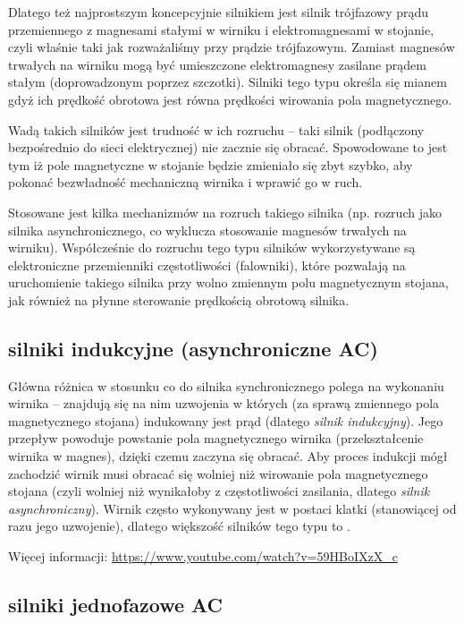Dlatego też najprostszym koncepcyjnie silnikiem jest silnik trójfazowy prądu przemiennego z magnesami stałymi w wirniku i elektromagnesami w stojanie, czyli właśnie taki jak rozważaliśmy przy prądzie trójfazowym.
Zamiast magnesów trwałych na wirniku mogą być umieszczone elektromagnesy zasilane prądem stałym (doprowadzonym poprzez szczotki).
Silniki tego typu określa się mianem  gdyż ich prędkość obrotowa jest równa prędkości wirowania pola magnetycznego.

Wadą takich silników jest trudność w ich rozruchu – taki silnik (podłączony bezpośrednio do sieci elektrycznej) nie zacznie się obracać.
Spowodowane to jest tym iż pole magnetyczne w stojanie będzie zmieniało się zbyt szybko, aby pokonać bezwładność mechaniczną wirnika i wprawić go w ruch.

Stosowane jest kilka mechanizmów na rozruch takiego silnika (np. rozruch jako silnika asynchronicznego, co wyklucza stosowanie magnesów trwałych na wirniku).
Współcześnie do rozruchu tego typu silników wykorzystywane są elektroniczne przemienniki częstotliwości (falowniki),
	które pozwalają na uruchomienie takiego silnika przy wolno zmiennym polu magnetycznym stojana, jak również na płynne sterowanie prędkością obrotową silnika.

\subsection{silniki indukcyjne (asynchroniczne AC)}

Główna różnica w stosunku co do silnika synchronicznego polega na wykonaniu wirnika – znajdują się na nim uzwojenia w których (za sprawą zmiennego pola magnetycznego stojana) indukowany jest prąd (dlatego \textit{silnik indukcyjny}).
Jego przepływ powoduje powstanie pola magnetycznego wirnika (przekształcenie wirnika w magnes), dzięki czemu zaczyna się obracać.
Aby proces indukcji mógł zachodzić wirnik musi obracać się wolniej niż wirowanie pola magnetycznego stojana (czyli wolniej niż wynikałoby z częstotliwości zasilania, dlatego \textit{silnik asynchroniczny}).
Wirnik często wykonywany jest w postaci klatki (stanowiącej od razu jego uzwojenie), dlatego większość silników tego typu to .

\noindent Więcej informacji: \url{https://www.youtube.com/watch?v=59HBoIXzX_c}

\subsection{silniki jednofazowe AC}

